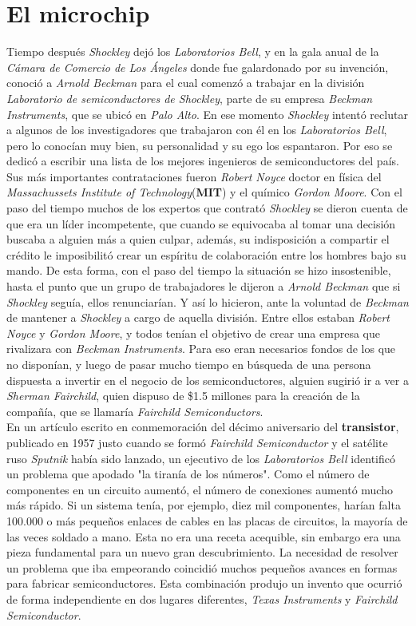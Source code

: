 \chapter{El microchip}\label{chapter:microchip}
Tiempo después \emph{Shockley} dejó los \emph{Laboratorios Bell}, y en la gala anual de la \emph
{Cámara de Comercio de Los Ángeles} donde fue galardonado por su invención, conoció a \emph{Arnold
Beckman} para el cual comenzó a trabajar en la división \emph{Laboratorio de semiconductores de Shockley}, 
parte de su empresa \emph{Beckman Instruments}, que se ubicó en \emph{Palo Alto}. En ese momento \emph{Shockley}
intentó reclutar a algunos de los investigadores que trabajaron con él en los \emph{Laboratorios Bell}, pero lo
conocían muy bien, su personalidad y su ego los espantaron. Por eso se dedicó a escribir una lista de los mejores
ingenieros de semiconductores del país. Sus más importantes contrataciones fueron \emph{Robert Noyce} doctor en 
física del \emph{Massachussets Institute of Technology}(\textbf{MIT}) y el químico \emph{Gordon Moore}. Con el paso 
del tiempo muchos de los expertos que contrató \emph{Shockley} se dieron cuenta de que era un líder incompetente, 
que cuando se equivocaba al tomar una decisión buscaba a alguien más a quien culpar, además, su indisposición a 
compartir el crédito le imposibilitó crear un espíritu de colaboración entre los hombres bajo su mando. De esta forma,
con el paso del tiempo la situación se hizo insostenible, hasta el punto que un grupo de trabajadores le dijeron a 
\emph{Arnold Beckman} que si \emph{Shockley} seguía, ellos renunciarían. Y así lo hicieron, ante la voluntad de \emph
{Beckman} de mantener a \emph{Shockley} a cargo de aquella división. Entre ellos estaban \emph{Robert Noyce} y \emph
{Gordon Moore}, y todos tenían el objetivo de crear una empresa que rivalizara con \emph{Beckman Instruments}. Para eso
eran necesarios fondos de los que no disponían, y luego de pasar mucho tiempo en búsqueda de una persona dispuesta a 
invertir en el negocio de los semiconductores, alguien sugirió ir a ver a \emph{Sherman Fairchild}, quien dispuso de
\$1.5 millones para la creación de la compañía, que se llamaría \emph{Fairchild Semiconductors}.\\
En un artículo escrito en conmemoración del décimo aniversario del \textbf{transistor}, publicado en 1957 justo
cuando se formó \emph{Fairchild Semiconductor} y el satélite ruso \emph {Sputnik} había sido lanzado, un ejecutivo
de los \emph{Laboratorios Bell} identificó un problema que apodado "la tiranía de los números". Como el número de
componentes en un circuito aumentó, el número de conexiones aumentó mucho más rápido. Si un sistema tenía, por
ejemplo, diez mil componentes, harían falta 100.000 o más pequeños enlaces de cables en las placas de circuitos,
la mayoría de las veces soldado a mano. Esta no era una receta acequible, sin embargo era una pieza fundamental
para un nuevo gran descubrimiento. La necesidad de resolver un problema que iba empeorando coincidió muchos pequeños
avances en formas para fabricar semiconductores. Esta combinación produjo un invento que ocurrió de forma independiente
en dos lugares diferentes, \emph{Texas Instruments} y \emph{Fairchild Semiconductor}. \\ 

